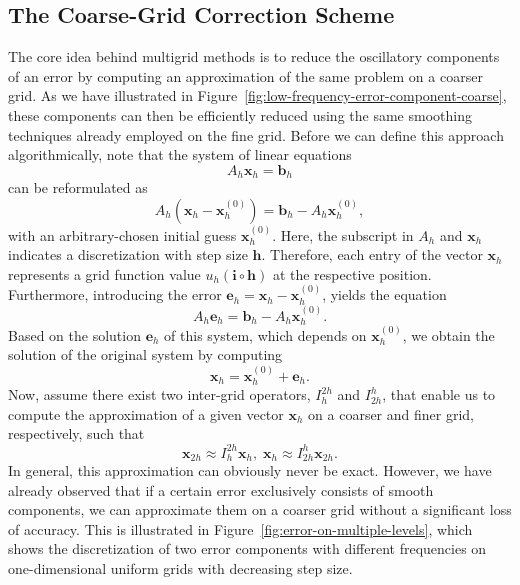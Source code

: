 \subsection{The Coarse-Grid Correction Scheme}
The core idea behind multigrid methods is to reduce the oscillatory components of an error by computing an approximation of the same problem on a coarser grid.
As we have illustrated in Figure~\ref{fig:low-frequency-error-component-coarse}, these components can then be efficiently reduced using the same smoothing techniques already employed on the fine grid.
Before we can define this approach algorithmically, note that the system of linear equations
\begin{equation}
	A_h \bm{x}_h = \bm{b}_h
\end{equation}
can be reformulated as
\begin{equation}
	A_h \left(\bm{x}_h - \bm {x}^{(0)}_h\right) = \bm{b}_h - A_h \bm{x}^{(0)}_h,
\end{equation}
with an arbitrary-chosen initial guess $\bm{x}^{(0)}_h$.
Here, the subscript in $A_h$ and $\bm{x}_h$ indicates a discretization with step size $\bm{h}$.
Therefore, each entry of the vector $\bm{x}_h$ represents a grid function value $u_h(\bm{i} \circ \bm{h})$ at the respective position.
Furthermore, introducing the error $\bm{e}_h = \bm{x}_h - \bm {x}^{(0)}_h$, yields the equation
\begin{equation}
	A_h \bm{e}_h = \bm{b}_h - A_h \bm{x}^{(0)}_h.
	\label{eq:linear-system-error-equation}
\end{equation}
Based on the solution $\bm{e}_h$ of this system, which depends on $\bm{x}^{(0)}_h$, we obtain the solution of the original system by computing
\begin{equation}
	\bm{x}_h = \bm{x}^{(0)}_h + \bm{e}_h.
\end{equation}
Now, assume there exist two inter-grid operators, $I_h^{2h}$ and $I_{2h}^h$, that enable us to compute the approximation of a given vector $\bm{x}_h$ on a coarser and finer grid, respectively, such that
\begin{equation}
	\bm{x}_{2h} \approx I_h^{2h} \bm{x}_{h}, \;
	\bm{x}_{h} \approx I_{2h}^{h} \bm{x}_{2h}. 
\end{equation}
In general, this approximation can obviously never be exact.
However, we have already observed that if a certain error exclusively consists of smooth components, we can approximate them on a coarser grid without a significant loss of accuracy.
This is illustrated in Figure~\ref{fig:error-on-multiple-levels}, which shows the discretization of two error components with different frequencies on one-dimensional uniform grids with decreasing step size.
